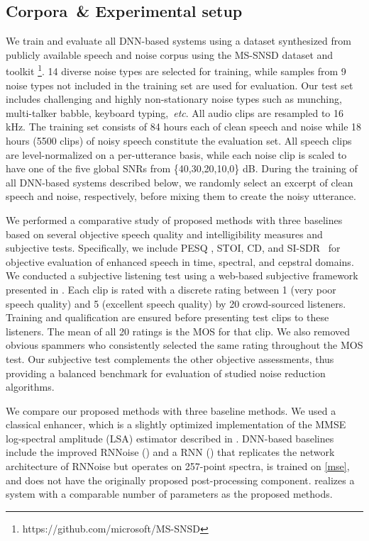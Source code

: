 \documentclass{article}
\begin{document}
\subsection{Corpora~\& Experimental setup}
We train and evaluate all DNN-based systems using a dataset synthesized from publicly available speech and noise corpus using the MS-SNSD dataset \cite{Reddy2019} and toolkit \footnote{https://github.com/microsoft/MS-SNSD}. 14 diverse noise types are selected for training, while samples from 9 noise types not included in the training set are used for evaluation. Our test set includes challenging and highly non-stationary noise types such as munching, multi-talker babble, keyboard typing,~\emph{etc}. All audio clips are resampled to 16 kHz. The training set consists of 84 hours each of clean speech and noise while 18 hours (5500 clips) of noisy speech constitute the evaluation set. All speech clips are level-normalized on a per-utterance basis, while each noise clip is scaled to have one of the five global SNRs from \{40,30,20,10,0\} dB. During the training of all DNN-based systems described below, we randomly select an excerpt of clean speech and noise, respectively, before mixing them to create the noisy utterance. 


We performed a comparative study of proposed methods with three baselines based on several objective speech quality and intelligibility measures and subjective tests. Specifically, we include \ac{PESQ} \cite{rix2001perceptual}, \ac{STOI}\cite{taal2010short}, \ac{CD}, and \ac{SI-SDR}~\cite{le2019sdr} for objective evaluation of enhanced speech in time, spectral, and cepstral domains. We conducted a subjective listening test using a web-based subjective framework presented in \cite{Reddy2019}. Each clip is rated with a discrete rating between 1 (very poor speech quality) and 5 (excellent speech quality) by 20 crowd-sourced listeners. Training and qualification are ensured before presenting test clips to these listeners. The mean of all 20 ratings is the \ac{MOS} for that clip. We also removed obvious spammers who consistently selected the same rating throughout the MOS test. Our subjective test complements the other objective assessments, thus providing a balanced benchmark for evaluation of studied noise reduction algorithms.


We compare our proposed methods with three baseline methods. We used a classical enhancer, which is a slightly optimized implementation of the MMSE log-spectral amplitude (LSA) estimator \cite{ephraim1985speech} described in \cite{tashev2009sound}. DNN-based baselines include the improved RNNoise () \cite{Reddy2019} and a RNN () that replicates the network architecture of RNNoise \cite{valin2018hybrid} but operates on 257-point spectra, is trained on \eqref{mse}, and does not have the originally proposed post-processing component.  realizes a system with a comparable number of parameters as the proposed methods. 
\end{document}
